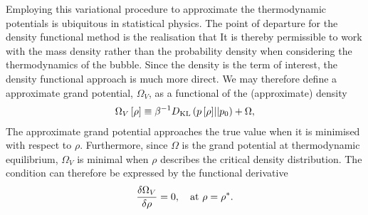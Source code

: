 Employing this variational procedure to approximate the thermodynamic potentials is ubiquitous in statistical physics\cite{Yedidia2000a}.
The point of departure for the density functional method is the realisation that
It is thereby permissible to work with the mass density rather than the probability density when considering the thermodynamics of the bubble.
Since the density is the term of interest, the density functional approach is much more direct.
We may therefore define a approximate grand potential, $\Omega_V$, as a functional of the (approximate) density \cite{Evans1992}
\begin{align}
 \Omega_V\left[ \rho \right] \equiv \beta^{-1}D_{\text {KL}}\left( {p\left[ \rho \right]}||{p_0} \right)+   \Omega, 
\end{align}
The approximate  grand potential approaches the true value when
it is minimised with  respect to $\rho$.
Furthermore, since $\Omega$ is the grand potential at thermodynamic equilibrium,
$\Omega_V$ is minimal when $\rho$ describes the  critical density distribution.
The condition 
can therefore be expressed by the functional derivative\cite{Oxtoby1992}
\begin{align}
  \frac{\delta \Omega_V}{\delta \rho} =0,\quad\text{at $\rho = {\rho^\ast}$.} \label{eqn:DFT:astar}
\end{align}


